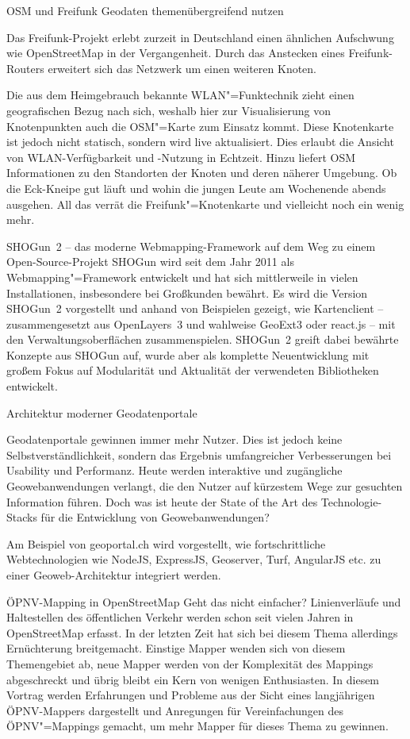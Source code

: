 %
{OSM und Freifunk}%
{Geodaten themenübergreifend nutzen}%
{%
Das Freifunk-Projekt erlebt zurzeit in Deutschland einen ähnlichen Aufschwung
wie OpenStreetMap in der Vergangenheit.
Durch das Anstecken eines Freifunk-Routers erweitert sich das Netzwerk um einen
weiteren Knoten.

Die aus dem
Heimgebrauch bekannte WLAN"=Funktechnik zieht einen
geografischen Bezug nach sich, weshalb hier zur Visualisierung von
Knotenpunkten auch die OSM"=Karte zum Einsatz kommt. Diese Knotenkarte ist jedoch
nicht statisch,
sondern wird live aktualisiert.
Dies erlaubt die Ansicht von WLAN-Verfügbarkeit und -Nutzung
in Echtzeit.
Hinzu liefert OSM Informationen zu den Standorten der Knoten und
deren näherer Umgebung. Ob die
Eck-Kneipe gut läuft und wohin die jungen Leute am Wochenende abends ausgehen.
All das verrät die
Freifunk"=Knotenkarte und vielleicht noch ein wenig mehr.}

%
{SHOGun~2 -- das moderne Webmapping-Framework}%
{auf dem Weg zu einem Open-Source-Projekt}%
{SHOGun wird seit dem Jahr 2011 als Webmapping"=Framework entwickelt und hat sich mittlerweile in
  vielen Installationen, insbesondere bei Großkunden bewährt.  Es wird die Version SHOGun~2
  vorgestellt und anhand von Beispielen gezeigt, wie Kartenclient --
zusammengesetzt aus OpenLayers~3 und wahlweise GeoExt3 oder react.js -- mit den
Verwaltungsoberflächen zusammenspielen.  SHOGun~2 greift dabei bewährte Konzepte aus SHOGun auf,
wurde aber als komplette Neuentwicklung mit großem Fokus auf Modularität und Aktualität der
verwendeten Bibliotheken entwickelt.}


%
{Architektur moderner Geodatenportale}%
{}%
{Geodatenportale gewinnen immer mehr Nutzer. Dies ist jedoch keine Selbstverständlichkeit, sondern
das Ergebnis umfangreicher Verbesserungen bei Usability und Performanz. Heute werden interaktive und
zugängliche Geowebanwendungen verlangt, die den Nutzer auf kürzestem Wege zur gesuchten Information
führen. Doch was ist heute der State of the Art des Technologie-Stacks für die Entwicklung von
Geowebanwendungen?

Am Beispiel von geoportal.ch wird vorgestellt, wie fortschrittliche
Webtechnologien wie NodeJS, ExpressJS, Geoserver, Turf, AngularJS etc. zu einer Geoweb-Architektur
integriert werden.}

%
{ÖPNV-Mapping in OpenStreetMap}%
{Geht das nicht einfacher?}%
{Linienverläufe und Haltestellen des öffentlichen Verkehr werden schon seit vielen Jahren in
OpenStreetMap erfasst. In der letzten Zeit hat sich bei diesem Thema allerdings Ernüchterung
breitgemacht. Einstige Mapper wenden sich von diesem Themengebiet ab, neue Mapper werden von der
Komplexität des Mappings abgeschreckt und übrig bleibt ein Kern von wenigen Enthusiasten.
In diesem
Vortrag werden Erfahrungen und Probleme aus der Sicht eines langjährigen ÖPNV-Mappers dargestellt
und Anregungen für Vereinfachungen des ÖPNV"=Mappings gemacht, um mehr Mapper für dieses Thema zu
gewinnen.}

